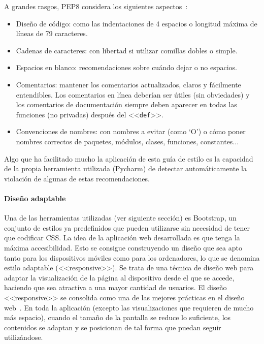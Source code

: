 A grandes rasgos, PEP8 considera los siguientes aspectos~\cite{pep8}:

\begin{itemize}
	\item Diseño de código: como las indentaciones de 4 espacios o longitud
	máxima de líneas de 79 caracteres.
	\item Cadenas de caracteres: con libertad si utilizar comillas dobles o
	simple.
	\item Espacios en blanco: recomendaciones sobre cuándo dejar o no espacios.
	\item Comentarios: mantener los comentarios actualizados, claros y
	fácilmente entendibles. Los comentarios en línea deberían ser útiles (sin
	obviedades) y los comentarios de documentación siempre deben aparecer en
	todas las funciones (no privadas) después del <<\texttt{def}>>.
	\item Convenciones de nombres: con nombres a evitar (como `O') o cómo poner
	nombres correctos de paquetes, módulos, clases, funciones, constantes...
\end{itemize}

Algo que ha facilitado mucho la aplicación de esta guía de estilo es la
capacidad de la propia herramienta utilizada (Pycharm) de detectar
automáticamente la violación de algunas de estas recomendaciones.

\paragraph{Diseño adaptable} Una de las herramientas utilizadas (ver siguiente
sección) es Bootstrap, un conjunto de estilos ya predefinidos que pueden
utilizarse sin necesidad de tener que codificar CSS. La idea de la aplicación
web desarrollada es que tenga la máxima accesibilidad. Esto se consigue
construyendo un diseño que sea apto tanto para los dispositivos móviles como
para los ordenadores, lo que se denomina estilo adaptable (<<responsive>>). Se
trata de una técnica de diseño web para adaptar la visualización de la página al
dispositivo desde el que se accede, haciendo que sea atractiva a una mayor
cantidad de usuarios. El diseño <<responsive>> se consolida como una de las
mejores prácticas en el diseño web~\cite{40defiebre}. En toda la aplicación
(excepto las visualizaciones que requieren de mucho más espacio), cuando el
tamaño de la pantalla se reduce lo suficiente, los contenidos se adaptan y se
posicionan de tal forma que puedan seguir utilizándose.

